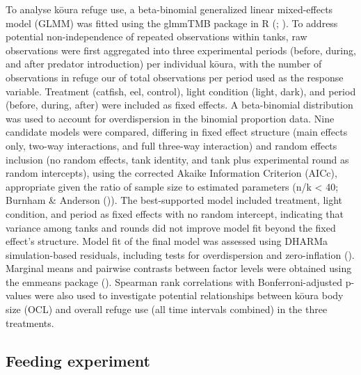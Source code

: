 \documentclass[
  letterpaper,
  DIV=11,
  numbers=noendperiod]{scrartcl}
\begin{document}
To analyse kōura refuge use, a beta-binomial generalized linear
mixed-effects model (GLMM) was fitted using the glmmTMB package in R
(;
). To address potential
non-independence of repeated observations within tanks, raw observations
were first aggregated into three experimental periods (before, during,
and after predator introduction) per individual kōura, with the number
of observations in refuge our of total observations per period used as
the response variable. Treatment (catfish, eel, control), light
condition (light, dark), and period (before, during, after) were
included as fixed effects. A beta-binomial distribution was used to
account for overdispersion in the binomial proportion data. Nine
candidate models were compared, differing in fixed effect structure
(main effects only, two-way interactions, and full three-way
interaction) and random effects inclusion (no random effects, tank
identity, and tank plus experimental round as random intercepts), using
the corrected Akaike Information Criterion (AICc), appropriate given the
ratio of sample size to estimated parameters (n/k \textless{} 40;
Burnham \& Anderson ()). The
best-supported model included treatment, light condition, and period as
fixed effects with no random intercept, indicating that variance among
tanks and rounds did not improve model fit beyond the fixed effect's
structure. Model fit of the final model was assessed using DHARMa
simulation-based residuals, including tests for overdispersion and
zero-inflation ().
Marginal means and pairwise contrasts between factor levels were
obtained using the emmeans package (). Spearman rank correlations with Bonferroni-adjusted
p-values were also used to investigate potential relationships between
kōura body size (OCL) and overall refuge use (all time intervals
combined) in the three treatments.

\subsection{Feeding experiment}\label{feeding-experiment}
\end{document}
